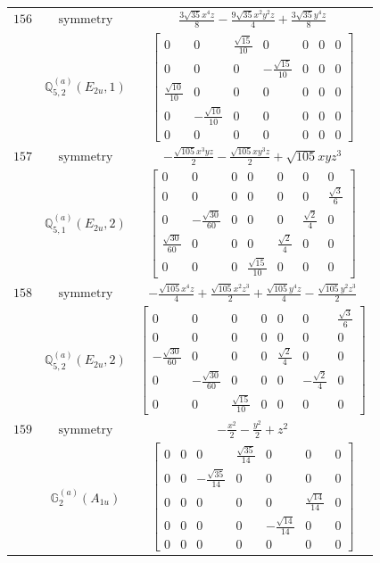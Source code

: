 \documentclass[fleqn,8pt,landscape]{jsarticle}
\begin{document}
\begin{longtable}{ccc}
$ 156 $ & $ \text{symmetry} $ & $ \frac{3 \sqrt{35} x^{4} z}{8} - \frac{9 \sqrt{35} x^{2} y^{2} z}{4} + \frac{3 \sqrt{35} y^{4} z}{8} $ \\
$  $ & $ \mathbb{Q}_{5,2}^{(a)}(E_{2u},1) $ & $ \begin{bmatrix} 0 & 0 & \frac{\sqrt{15}}{10} & 0 & 0 & 0 & 0 \\ 0 & 0 & 0 & - \frac{\sqrt{15}}{10} & 0 & 0 & 0 \\ \frac{\sqrt{10}}{10} & 0 & 0 & 0 & 0 & 0 & 0 \\ 0 & - \frac{\sqrt{10}}{10} & 0 & 0 & 0 & 0 & 0 \\ 0 & 0 & 0 & 0 & 0 & 0 & 0 \end{bmatrix} $ \\ \hline
$ 157 $ & $ \text{symmetry} $ & $ - \frac{\sqrt{105} x^{3} y z}{2} - \frac{\sqrt{105} x y^{3} z}{2} + \sqrt{105} x y z^{3} $ \\
$  $ & $ \mathbb{Q}_{5,1}^{(a)}(E_{2u},2) $ & $ \begin{bmatrix} 0 & 0 & 0 & 0 & 0 & 0 & 0 \\ 0 & 0 & 0 & 0 & 0 & 0 & \frac{\sqrt{3}}{6} \\ 0 & - \frac{\sqrt{30}}{60} & 0 & 0 & 0 & \frac{\sqrt{2}}{4} & 0 \\ \frac{\sqrt{30}}{60} & 0 & 0 & 0 & \frac{\sqrt{2}}{4} & 0 & 0 \\ 0 & 0 & 0 & \frac{\sqrt{15}}{10} & 0 & 0 & 0 \end{bmatrix} $ \\ \hline
$ 158 $ & $ \text{symmetry} $ & $ - \frac{\sqrt{105} x^{4} z}{4} + \frac{\sqrt{105} x^{2} z^{3}}{2} + \frac{\sqrt{105} y^{4} z}{4} - \frac{\sqrt{105} y^{2} z^{3}}{2} $ \\
$  $ & $ \mathbb{Q}_{5,2}^{(a)}(E_{2u},2) $ & $ \begin{bmatrix} 0 & 0 & 0 & 0 & 0 & 0 & \frac{\sqrt{3}}{6} \\ 0 & 0 & 0 & 0 & 0 & 0 & 0 \\ - \frac{\sqrt{30}}{60} & 0 & 0 & 0 & \frac{\sqrt{2}}{4} & 0 & 0 \\ 0 & - \frac{\sqrt{30}}{60} & 0 & 0 & 0 & - \frac{\sqrt{2}}{4} & 0 \\ 0 & 0 & \frac{\sqrt{15}}{10} & 0 & 0 & 0 & 0 \end{bmatrix} $ \\ \hline
$ 159 $ & $ \text{symmetry} $ & $ - \frac{x^{2}}{2} - \frac{y^{2}}{2} + z^{2} $ \\
$  $ & $ \mathbb{G}_{2}^{(a)}(A_{1u}) $ & $ \begin{bmatrix} 0 & 0 & 0 & \frac{\sqrt{35}}{14} & 0 & 0 & 0 \\ 0 & 0 & - \frac{\sqrt{35}}{14} & 0 & 0 & 0 & 0 \\ 0 & 0 & 0 & 0 & 0 & \frac{\sqrt{14}}{14} & 0 \\ 0 & 0 & 0 & 0 & - \frac{\sqrt{14}}{14} & 0 & 0 \\ 0 & 0 & 0 & 0 & 0 & 0 & 0 \end{bmatrix} $ \\ \hline

\end{longtable}
\end{document}
